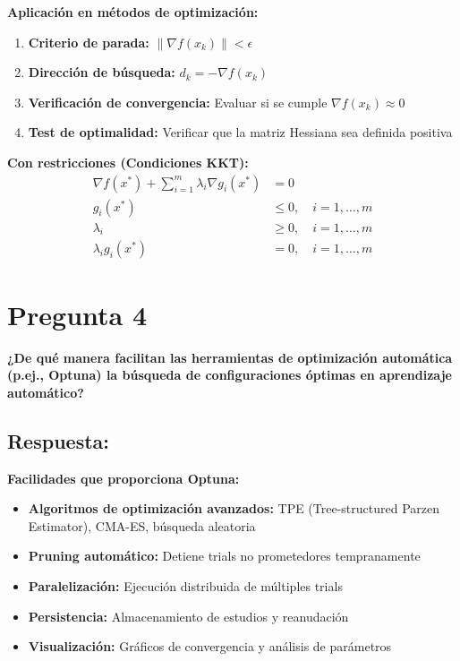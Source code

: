 \documentclass[12pt]{article}
\begin{document}
\textbf{Aplicación en métodos de optimización:}
\begin{enumerate}
    \item \textbf{Criterio de parada:} $\|\nabla f(x_k)\| < \epsilon$
    \item \textbf{Dirección de búsqueda:} $d_k = -\nabla f(x_k)$
    \item \textbf{Verificación de convergencia:} Evaluar si se cumple $\nabla f(x_k) \approx 0$
    \item \textbf{Test de optimalidad:} Verificar que la matriz Hessiana sea definida positiva
\end{enumerate}

\textbf{Con restricciones (Condiciones KKT):}
\begin{align}
\nabla f(x^*) + \sum_{i=1}^m \lambda_i \nabla g_i(x^*) &= 0\\
g_i(x^*) &\leq 0, \quad i = 1,\ldots,m\\
\lambda_i &\geq 0, \quad i = 1,\ldots,m\\
\lambda_i g_i(x^*) &= 0, \quad i = 1,\ldots,m
\end{align}

\section*{Pregunta 4}
\textbf{¿De qué manera facilitan las herramientas de optimización automática (p.ej., Optuna) la búsqueda de configuraciones óptimas en aprendizaje automático?}

\subsection*{Respuesta:}

\textbf{Facilidades que proporciona Optuna:}

\begin{itemize}
    \item \textbf{Algoritmos de optimización avanzados:} TPE (Tree-structured Parzen Estimator), CMA-ES, búsqueda aleatoria
    \item \textbf{Pruning automático:} Detiene trials no prometedores tempranamente
    \item \textbf{Paralelización:} Ejecución distribuida de múltiples trials
    \item \textbf{Persistencia:} Almacenamiento de estudios y reanudación
    \item \textbf{Visualización:} Gráficos de convergencia y análisis de parámetros
\end{itemize}
\end{document}
